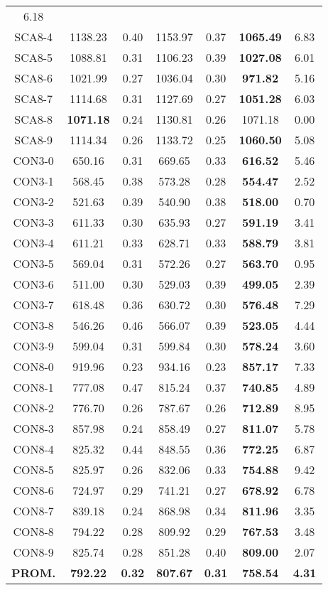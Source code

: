 \begin{table}[h]
\begin{tabular}{c c c c c c c}
6.18\\SCA8-4 & 1138.23 & 0.40 & 
1153.97 & 0.37 & \bf{1065.49} & 
6.83\\SCA8-5 & 1088.81 & 0.31 & 
1106.23 & 0.39 & \bf{1027.08} & 
6.01\\SCA8-6 & 1021.99 & 0.27 & 
1036.04 & 0.30 & \bf{971.82} & 
5.16\\SCA8-7 & 1114.68 & 0.31 & 
1127.69 & 0.27 & \bf{1051.28} & 
6.03\\SCA8-8 & \bf{1071.18} & 0.24 & 
1130.81 & 0.26 & 1071.18 & 0.00\\
SCA8-9 & 1114.34 & 0.26 & 
1133.72 & 0.25 & \bf{1060.50} & 
5.08\\CON3-0 & 650.16 & 0.31 & 
669.65 & 0.33 & \bf{616.52} & 
5.46\\CON3-1 & 568.45 & 0.38 & 
573.28 & 0.28 & \bf{554.47} & 
2.52\\CON3-2 & 521.63 & 0.39 & 
540.90 & 0.38 & \bf{518.00} & 
0.70\\CON3-3 & 611.33 & 0.30 & 
635.93 & 0.27 & \bf{591.19} & 
3.41\\CON3-4 & 611.21 & 0.33 & 
628.71 & 0.33 & \bf{588.79} & 
3.81\\CON3-5 & 569.04 & 0.31 & 
572.26 & 0.27 & \bf{563.70} & 
0.95\\CON3-6 & 511.00 & 0.30 & 
529.03 & 0.39 & \bf{499.05} & 
2.39\\CON3-7 & 618.48 & 0.36 & 
630.72 & 0.30 & \bf{576.48} & 
7.29\\CON3-8 & 546.26 & 0.46 & 
566.07 & 0.39 & \bf{523.05} & 
4.44\\CON3-9 & 599.04 & 0.31 & 
599.84 & 0.30 & \bf{578.24} & 
3.60\\CON8-0 & 919.96 & 0.23 & 
934.16 & 0.23 & \bf{857.17} & 
7.33\\CON8-1 & 777.08 & 0.47 & 
815.24 & 0.37 & \bf{740.85} & 
4.89\\CON8-2 & 776.70 & 0.26 & 
787.67 & 0.26 & \bf{712.89} & 
8.95\\CON8-3 & 857.98 & 0.24 & 
858.49 & 0.27 & \bf{811.07} & 
5.78\\CON8-4 & 825.32 & 0.44 & 
848.55 & 0.36 & \bf{772.25} & 
6.87\\CON8-5 & 825.97 & 0.26 & 
832.06 & 0.33 & \bf{754.88} & 
9.42\\CON8-6 & 724.97 & 0.29 & 
741.21 & 0.27 & \bf{678.92} & 
6.78\\CON8-7 & 839.18 & 0.24 & 
868.98 & 0.34 & \bf{811.96} & 
3.35\\CON8-8 & 794.22 & 0.28 & 
809.92 & 0.29 & \bf{767.53} & 
3.48\\CON8-9 & 825.74 & 0.28 & 
851.28 & 0.40 & \bf{809.00} & 
2.07\\\bf{PROM.} & 
\bf{792.22} & \bf{0.32} & \bf{807.67} & \bf{0.31} & \bf{758.54} & \bf{4.31}\\[1ex]\hline
\end{tabular}
\label{table:ILS-VND-M-5-10}
\end{table}

